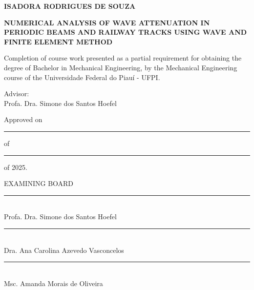 

\newpage

\begin{center}
\textbf{ISADORA RODRIGUES DE SOUZA}
\par
\vspace{1.5cm}
\textbf{NUMERICAL ANALYSIS OF WAVE ATTENUATION IN PERIODIC BEAMS AND RAILWAY TRACKS USING WAVE AND FINITE ELEMENT METHOD}
\end{center}
\par
\vspace{1.5cm}
\hspace*{160pt}\parbox{9cm}{{Completion of course work presented as a partial requirement for obtaining the degree of Bachelor in Mechanical Engineering, by the Mechanical Engineering course of the Universidade Federal do Piauí - UFPI.}}
\vspace{1.5cm}
\par\hspace*{160pt}\parbox{9cm}{Advisor:\\ Profa. Dra. Simone dos Santos Hoefel}
\vspace{1cm}
\begin{center}
Approved on \rule{1cm}{1pt} of \rule{3cm}{1pt} of 2025.
\vspace{2cm}

EXAMINING BOARD
\vspace{1cm}

\rule{14cm}{1pt}\\
Profa. Dra. Simone dos Santos Hoefel
\vspace{1cm}

\rule{14cm}{1pt}\\
Dra. Ana Carolina Azevedo Vasconcelos
\vspace{1cm}

\rule{14cm}{1pt}\\
Msc. Amanda Morais de Oliveira

\end{center}


\cleardoublepage


